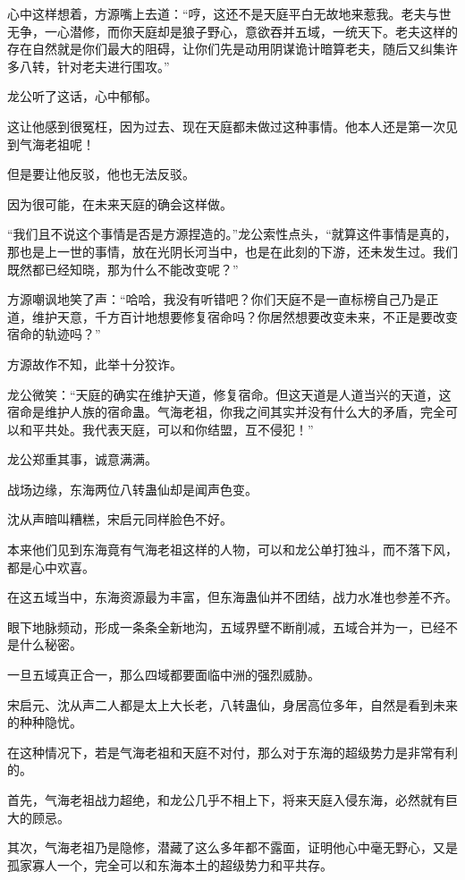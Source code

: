 \begin{this_body}
心中这样想着，方源嘴上去道：“哼，这还不是天庭平白无故地来惹我。老夫与世无争，一心潜修，而你天庭却是狼子野心，意欲吞并五域，一统天下。老夫这样的存在自然就是你们最大的阻碍，让你们先是动用阴谋诡计暗算老夫，随后又纠集许多八转，针对老夫进行围攻。”

龙公听了这话，心中郁郁。

这让他感到很冤枉，因为过去、现在天庭都未做过这种事情。他本人还是第一次见到气海老祖呢！

但是要让他反驳，他也无法反驳。

因为很可能，在未来天庭的确会这样做。

“我们且不说这个事情是否是方源捏造的。”龙公索性点头，“就算这件事情是真的，那也是上一世的事情，放在光阴长河当中，也是在此刻的下游，还未发生过。我们既然都已经知晓，那为什么不能改变呢？”

方源嘲讽地笑了声：“哈哈，我没有听错吧？你们天庭不是一直标榜自己乃是正道，维护天意，千方百计地想要修复宿命吗？你居然想要改变未来，不正是要改变宿命的轨迹吗？”

方源故作不知，此举十分狡诈。

龙公微笑：“天庭的确实在维护天道，修复宿命。但这天道是人道当兴的天道，这宿命是维护人族的宿命蛊。气海老祖，你我之间其实并没有什么大的矛盾，完全可以和平共处。我代表天庭，可以和你结盟，互不侵犯！”

龙公郑重其事，诚意满满。

战场边缘，东海两位八转蛊仙却是闻声色变。

沈从声暗叫糟糕，宋启元同样脸色不好。

本来他们见到东海竟有气海老祖这样的人物，可以和龙公单打独斗，而不落下风，都是心中欢喜。

在这五域当中，东海资源最为丰富，但东海蛊仙并不团结，战力水准也参差不齐。

眼下地脉频动，形成一条条全新地沟，五域界壁不断削减，五域合并为一，已经不是什么秘密。

一旦五域真正合一，那么四域都要面临中洲的强烈威胁。

宋启元、沈从声二人都是太上大长老，八转蛊仙，身居高位多年，自然是看到未来的种种隐忧。

在这种情况下，若是气海老祖和天庭不对付，那么对于东海的超级势力是非常有利的。

首先，气海老祖战力超绝，和龙公几乎不相上下，将来天庭入侵东海，必然就有巨大的顾忌。

其次，气海老祖乃是隐修，潜藏了这么多年都不露面，证明他心中毫无野心，又是孤家寡人一个，完全可以和东海本土的超级势力和平共存。


\end{this_body}
